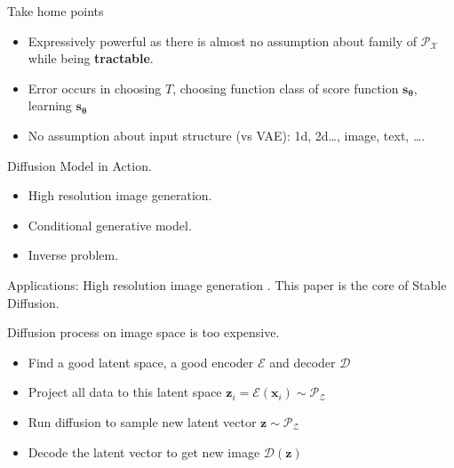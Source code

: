 \documentclass[10pt,xcolor={usenames,dvipsnames,table},aspectratio=169]{beamer}
\begin{document}
\begin{frame}{Take home points}
\begin{itemize}
    \item Expressively powerful as there is almost no assumption about family of $\mathcal{P}_{\mathcal{X}}$ while being \textbf{tractable}.
    \item Error occurs in choosing $T$, choosing function class of score function $\bm{s}_{\boldsymbol \theta}$, learning $\bm{s}_{\boldsymbol \theta}$
    \item No assumption about input structure (vs VAE): 1d, 2d\ldots , image, text, \ldots. 
\end{itemize}
\end{frame}

\begin{frame}{Diffusion Model in Action.}
    \begin{itemize}
        \item High resolution image generation.
        \item Conditional generative model.
        \item Inverse problem.
    \end{itemize}
\end{frame}

\begin{frame}{Applications: High resolution image generation}
    .
    This paper is the core of Stable Diffusion.

    Diffusion process on image space is too expensive. 
    \begin{itemize}
        \item Find a good latent space, a good encoder $\mathcal{E}$ and decoder $\mathcal{D}$
        \item Project all data to this latent space $\bm{z}_i = \mathcal{E}(\bm{x}_i) \sim \mathcal{P}_{\mathcal{Z}}$
        \item Run diffusion to sample new latent vector $\bm{z} \sim \mathcal{P}_{\mathcal{Z}}$
        \item Decode the latent vector to get new image $\mathcal{D}(\bm{z})$
    \end{itemize}
\end{frame}
\end{document}
